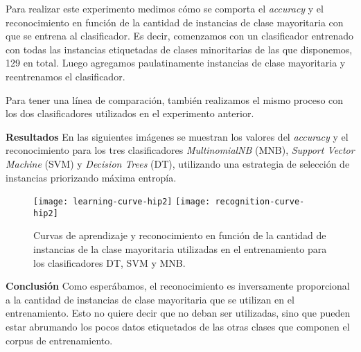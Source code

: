Para realizar este experimento medimos cómo se comporta el \textit{accuracy} y el reconocimiento en función de la cantidad de instancias de clase mayoritaria con que se entrena al clasificador. Es decir, comenzamos con un clasificador entrenado con todas las instancias etiquetadas de clases minoritarias de las que disponemos, 129 en total. Luego agregamos paulatinamente instancias de clase mayoritaria y reentrenamos el clasificador.

Para tener una línea de comparación, también realizamos el mismo proceso con los dos clasificadores utilizados en el experimento anterior.

\vspace{3 mm}

\textbf{Resultados} En las siguientes imágenes se muestran los valores del \textit{accuracy} y el reconocimiento para los tres clasificadores \textit{MultinomialNB} (MNB), \textit{Support Vector Machine} (SVM) y \textit{Decision Trees} (DT), utilizando una estrategia de selección de instancias priorizando máxima entropía.

\begin{figure}[h!]\label{curva-apr-hip2}
\texttt{[image: learning-curve-hip2]}
\texttt{[image: recognition-curve-hip2]}
\caption{Curvas de aprendizaje y reconocimiento en función de la cantidad de instancias de la clase mayoritaria utilizadas en el entrenamiento para los clasificadores DT, SVM y MNB.}
\centering
\end{figure}

\vspace{3 mm}

\textbf{Conclusión}
Como esperábamos, el reconocimiento es inversamente proporcional a la cantidad de instancias de clase mayoritaria que se utilizan en el entrenamiento. Esto no quiere decir que no deban ser utilizadas, sino que pueden estar abrumando los pocos datos etiquetados de las otras clases que componen el corpus de entrenamiento.


